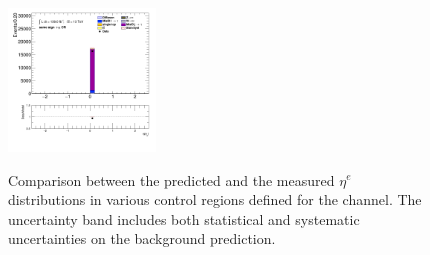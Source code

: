 \begin{figure}[!htp]
\begin{center}
			\includegraphics[width=0.35\textwidth]{chapters/chapter6_HPlus/images/taulep/el_0_eta_SS_TAUMU.png} \\
			\end{center}
			\caption{
			Comparison between the predicted and the measured $\eta^{e}$ distributions in various control regions defined for the \taulep channel. The uncertainty band includes both statistical and systematic uncertainties on the background prediction. 
			}
			\label{fig:bkg-eta-el-taulep}
		\end{figure}

